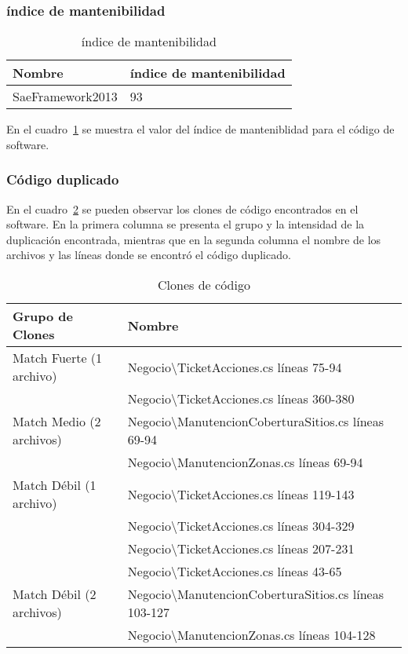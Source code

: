 \subsubsection{índice de mantenibilidad}

\begin{table}[hb]
\centering
    \begin{tabular}{|l|l|}
    \hline
    \bf{Nombre}      & \bf{índice de mantenibilidad} \\ \hline
    SaeFramework2013 & 93                              \\ \hline
    \end{tabular}
    \caption{índice de mantenibilidad}
    \label{table:MI}
\end{table}

En el cuadro~\ref{table:MI} se muestra el valor del índice de manteniblidad para el código de software.

\newpage

\subsubsection{Código duplicado}

En el cuadro~\ref{table:clones} se pueden observar los clones de código 
encontrados en el software. En la primera columna se presenta el grupo y la 
intensidad de la duplicación encontrada, mientras que en la segunda columna el
nombre de los archivos y las líneas donde se encontró el código duplicado.

\begin{table}[hb]
\centering

  \begin{tabular}{ | l | l | }
  
  \hline
    \bf{Grupo de Clones} & \bf{Nombre} \\ \hline
    Match Fuerte (1 archivo) & Negocio\textbackslash TicketAcciones.cs líneas 75-94 \\ \hline
     & Negocio\textbackslash TicketAcciones.cs líneas 360-380 \\ \hline
    Match Medio (2 archivos) & Negocio\textbackslash ManutencionCoberturaSitios.cs líneas 69-94 \\ \hline
     & Negocio\textbackslash ManutencionZonas.cs líneas 69-94 \\ \hline
    Match Débil (1 archivo) & Negocio\textbackslash TicketAcciones.cs líneas 119-143 \\ \hline
     & Negocio\textbackslash TicketAcciones.cs líneas 304-329 \\ \hline
     & Negocio\textbackslash TicketAcciones.cs líneas 207-231 \\ \hline
     & Negocio\textbackslash TicketAcciones.cs líneas 43-65 \\ \hline
    Match Débil (2 archivos) & Negocio\textbackslash ManutencionCoberturaSitios.cs líneas 103-127 \\ \hline
     & Negocio\textbackslash ManutencionZonas.cs líneas 104-128 \\ \hline
  \end{tabular}
  \caption{Clones de código}
  \label{table:clones}
\end{table}




